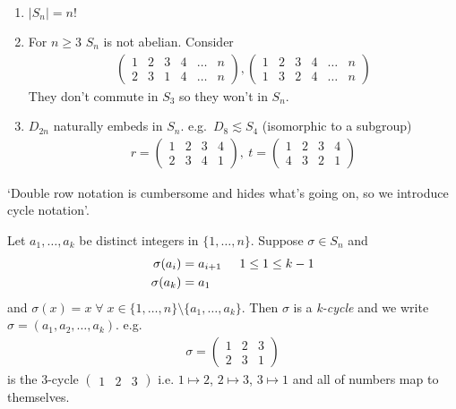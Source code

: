 \begin{remark} \mbox{}
\begin{enumerate}
\def\labelenumi{\roman{enumi}.}
\item
  \(|S_n| = n!\)
\item
  For \(n \geq 3\) \(S_n\) is not abelian.
  Consider
  \begin{align*}
  \begin{pmatrix}
  1 & 2 & 3 & 4 & \ldots & n \\
  2 & 3 & 1 & 4 & \ldots & n
  \end{pmatrix}, 
  \begin{pmatrix}
      1 & 2 & 3 & 4 & \ldots & n \\
      1 & 3 & 2 & 4 & \ldots & n
  \end{pmatrix}
  \end{align*}
  They don't commute in \(S_3\) so they won't in \(S_n\).
\item
  \(D_{2n}\) naturally embeds in \(S_n\).
  e.g.~\(D_8 \lesssim S_4\) (isomorphic to a subgroup)
  \begin{align*}
      r = \begin{pmatrix}
      1 & 2 & 3 & 4 \\
      2 & 3 & 4 & 1
      \end{pmatrix},\ t = 
      \begin{pmatrix}
      1 & 2 & 3 & 4 \\
      4 & 3 & 2 & 1
      \end{pmatrix}
  \end{align*}
\end{enumerate}

\end{remark}

`Double row notation is cumbersome and hides what's going on, so we introduce cycle notation'.

\begin{definition}
Let \(a_1, \ldots, a_k\) be distinct integers in \(\{ 1, \ldots, n \}\).
Suppose \(\sigma \in S_n\) and
\begin{align*}
    \sigma(a_i) &= a_{i + 1} \hspace{0.5cm} 1 \leq 1 \leq k - 1 \\
    \sigma(a_k) &= a_1
\end{align*}
and \(\sigma(x) = x \; \forall \; x \in \{ 1, \ldots, n \} \setminus \{ a_1, \ldots, a_k \}\).
Then \(\sigma\) is a \emph{k-cycle} and we write \(\sigma = (a_1, a_2, \ldots, a_k)\).
e.g.~\begin{align*}
    \sigma = \begin{pmatrix}
    1 & 2 & 3 \\
    2 & 3 & 1
    \end{pmatrix}
\end{align*} is the 3-cycle \(\begin{pmatrix}1 & 2 & 3\end{pmatrix}\) i.e. $1 \mapsto 2$, $2\mapsto 3$, $3\mapsto 1$ and all of numbers map to themselves.
\end{definition}

